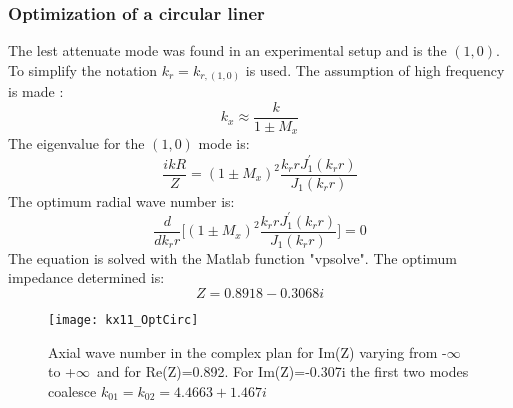 \subsubsection{Optimization of a circular liner}

The lest attenuate mode was found in an experimental setup and is the $(1,0)$. To simplify the notation $k_r=k_{r,(1,0)}$ is used. The assumption of high frequency is made \cite{Kabral_thesis}: 
\begin{equation}
    k_x\approx\frac{k}{1\pm M_x}
\end{equation}
The eigenvalue for the $(1,0)$ mode is:
\begin{equation}
   \frac{ikR}{Z}=(1\pm M_x)^2 \frac{k_r r J_1^' (k_r r)}{J_1(k_r r)}
\end{equation}
The optimum radial wave number is:
\begin{equation}
    \frac{d}{dk_r r}\Bigg[(1\pm M_x)^2 \frac{k_r r J_1^' (k_r r)}{J_1(k_r r)}\Bigg]=0
\end{equation}
The equation is solved with the Matlab function "vpsolve". The optimum impedance determined is: 
\begin{equation}
    Z=   0.8918 - 0.3068i
\end{equation}
\begin{figure}[H] \centering
    \texttt{[image: kx11\_OptCirc]}
    \caption{Axial wave number in the complex plan for Im(Z) varying from -$\infty$ to +$\infty$\ and for Re(Z)=0.892. For Im(Z)=-0.307i the first two modes coalesce $k_{01}=k_{02}=4.4663 + 1.467i$ \cite{An_Introduction_to_Acoustics}}
\end{figure}

